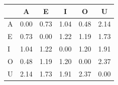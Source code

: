 \begin{tabular}{lccccc}
\toprule
\rowcolor{col01}
 & A & E & I & O & U \\
\midrule
A & 0.00 & 0.73 & 1.04 & 0.48 & 2.14 \\
E & 0.73 & 0.00 & 1.22 & 1.19 & 1.73 \\
I & 1.04 & 1.22 & 0.00 & 1.20 & 1.91 \\
O & 0.48 & 1.19 & 1.20 & 0.00 & 2.37 \\
U & 2.14 & 1.73 & 1.91 & 2.37 & 0.00 \\
\bottomrule
\end{tabular}
